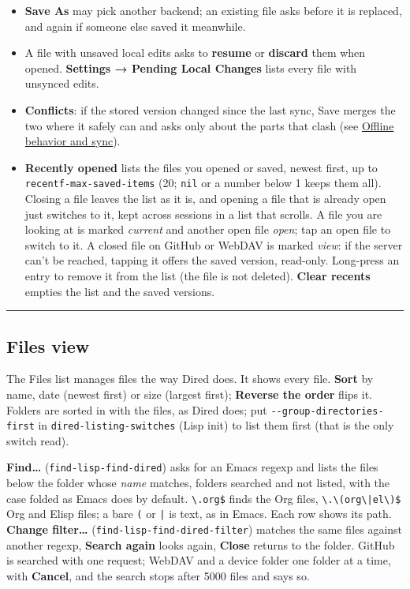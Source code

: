 \documentclass[11pt]{article}
\begin{document}
\begin{itemize}
\item \textbf{Save As} may pick another backend; an existing file asks before it is replaced, and again if someone else saved it meanwhile.
\item A file with unsaved local edits asks to \textbf{resume} or \textbf{discard} them when opened. \textbf{Settings → Pending Local Changes} lists every file with unsynced edits.
\item \textbf{Conflicts}: if the stored version changed since the last sync, Save merges the two where it safely can and asks only about the parts that clash (see \hyperref[sec:org1ff17da]{Offline behavior and sync}).
\item \textbf{Recently opened} lists the files you opened or saved, newest first, up to \texttt{recentf-max-saved-items} (20; \texttt{nil} or a number below 1 keeps them all). Closing a file leaves the list as it is, and opening a file that is already open just switches to it, kept across sessions in a list that scrolls. A file you are looking at is marked \emph{current} and another open file \emph{open}; tap an open file to switch to it. A closed file on GitHub or WebDAV is marked \emph{view}: if the server can't be reached, tapping it offers the saved version, read-only. Long-press an entry to remove it from the list (the file is not deleted). \textbf{Clear recents} empties the list and the saved versions.
\end{itemize}

\noindent\rule{\textwidth}{0.5pt}

\subsection{Files view}
\label{sec:org45e6d31}
The Files list manages files the way Dired does. It shows every file. \textbf{Sort} by name, date (newest first) or size (largest first); \textbf{Reverse the order} flips it. Folders are sorted in with the files, as Dired does; put \texttt{-{}-{}group-directories-first} in \texttt{dired-listing-switches} (Lisp init) to list them first (that is the only switch read).

\textbf{Find…} (\texttt{find-lisp-find-dired}) asks for an Emacs regexp and lists the files below the folder whose \emph{name} matches, folders searched and not listed, with the case folded as Emacs does by default. \texttt{\textbackslash{}.org\$} finds the Org files, \texttt{\textbackslash{}.\textbackslash{}(org\textbackslash{}|el\textbackslash{})\$} Org and Elisp files; a bare \texttt{(} or \texttt{|} is text, as in Emacs. Each row shows its path. \textbf{Change filter…} (\texttt{find-lisp-find-dired-filter}) matches the same files against another regexp, \textbf{Search again} looks again, \textbf{Close} returns to the folder. GitHub is searched with one request; WebDAV and a device folder one folder at a time, with \textbf{Cancel}, and the search stops after 5000 files and says so.
\end{document}
